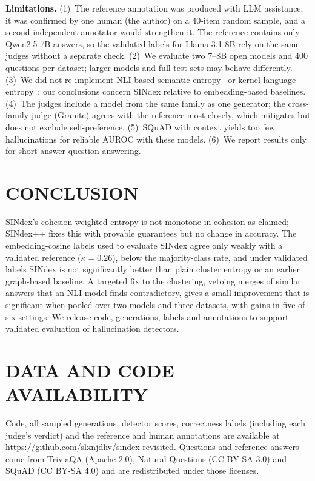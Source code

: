 \documentclass{ieeetj}
\begin{document}
\textbf{Limitations.} (1)~The reference annotation was produced with LLM assistance; it was confirmed by one human (the author) on a 40-item random sample, and a second independent annotator would strengthen it. The reference contains only Qwen2.5-7B answers, so the validated labels for Llama-3.1-8B rely on the same judges without a separate check. (2)~We evaluate two 7--8B open models and 400 questions per dataset; larger models and full test sets may behave differently. (3)~We did not re-implement NLI-based semantic entropy~\cite{farquhar2024detecting} or kernel language entropy~\cite{nikitin2024kernel}; our conclusions concern SINdex relative to embedding-based baselines. (4)~The judges include a model from the same family as one generator; the cross-family judge (Granite) agrees with the reference most closely, which mitigates but does not exclude self-preference. (5)~SQuAD with context yields too few hallucinations for reliable AUROC with these models. (6)~We report results only for short-answer question answering.

\section{CONCLUSION}
SINdex's cohesion-weighted entropy is not monotone in cohesion as claimed; SINdex++ fixes this with provable guarantees but no change in accuracy. The embedding-cosine labels used to evaluate SINdex agree only weakly with a validated reference ($\kappa=0.26$), below the majority-class rate, and under validated labels SINdex is not significantly better than plain cluster entropy or an earlier graph-based baseline. A targeted fix to the clustering, vetoing merges of similar answers that an NLI model finds contradictory, gives a small improvement that is significant when pooled over two models and three datasets, with gains in five of six settings. We release code, generations, labels and annotations to support validated evaluation of hallucination detectors.

\section*{DATA AND CODE AVAILABILITY}
Code, all sampled generations, detector scores, correctness labels (including each judge's verdict) and the reference and human annotations are available at \url{https://github.com/slxnjdhv/sindex-revisited}. Questions and reference answers come from TriviaQA (Apache-2.0), Natural Questions (CC BY-SA 3.0) and SQuAD (CC BY-SA 4.0) and are redistributed under those licenses.
\end{document}
